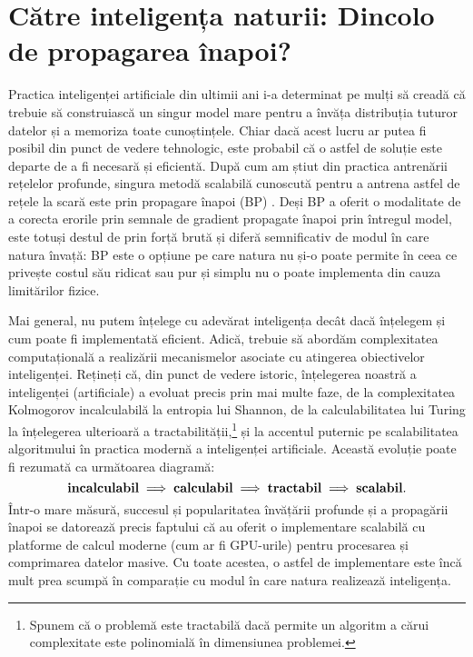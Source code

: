 \documentclass[../../book-main_ro.tex]{subfiles}
\begin{document}
\section{Către inteligența naturii: Dincolo de propagarea înapoi?}
Practica inteligenței artificiale din ultimii ani i-a determinat pe mulți să creadă că trebuie să construiască un singur model mare pentru a învăța distribuția tuturor datelor și a memoriza toate cunoștințele. Chiar dacă acest lucru ar putea fi posibil din punct de vedere tehnologic, este probabil că o astfel de soluție este departe de a fi necesară și eficientă. După cum am știut din practica antrenării rețelelor profunde, singura metodă scalabilă cunoscută pentru a antrena astfel de rețele la scară este prin propagare înapoi (BP) \cite{Back-Prop}. Deși BP a oferit o modalitate de a corecta erorile prin semnale de gradient propagate înapoi prin întregul model, este totuși destul de prin forță brută și diferă semnificativ de modul în care natura învață: BP este o opțiune pe care natura nu și-o poate permite în ceea ce privește costul său ridicat sau pur și simplu nu o poate implementa din cauza limitărilor fizice.

Mai general, nu putem înțelege cu adevărat inteligența decât dacă înțelegem și cum poate fi implementată eficient. Adică, trebuie să abordăm complexitatea computațională a realizării mecanismelor asociate cu atingerea obiectivelor inteligenței. Rețineți că, din punct de vedere istoric, înțelegerea noastră a inteligenței (artificiale) a evoluat precis prin mai multe faze, de la complexitatea Kolmogorov incalculabilă la entropia lui Shannon, de la calculabilitatea lui Turing la înțelegerea ulterioară a tractabilității,\footnote{Spunem că o problemă este tractabilă dacă permite un algoritm a cărui complexitate este polinomială în dimensiunea problemei.} și la accentul puternic pe scalabilitatea algoritmului în practica modernă a inteligenței artificiale. Această evoluție poate fi rezumată ca următoarea diagramă:
\begin{equation}
   \mbox{\textbf{incalculabil}} \;
   \Longrightarrow \; \mbox{\textbf{calculabil}} \;
   \Longrightarrow \; \mbox{\textbf{tractabil}} \; \Longrightarrow \; 
   \mbox{\textbf{scalabil}}.
\end{equation}
Într-o mare măsură, succesul și popularitatea învățării profunde și a propagării înapoi se datorează precis faptului că au oferit o implementare scalabilă cu platforme de calcul moderne (cum ar fi GPU-urile) pentru procesarea și comprimarea datelor masive. Cu toate acestea, o astfel de implementare este încă mult prea scumpă în comparație cu modul în care natura realizează inteligența.
\end{document}
